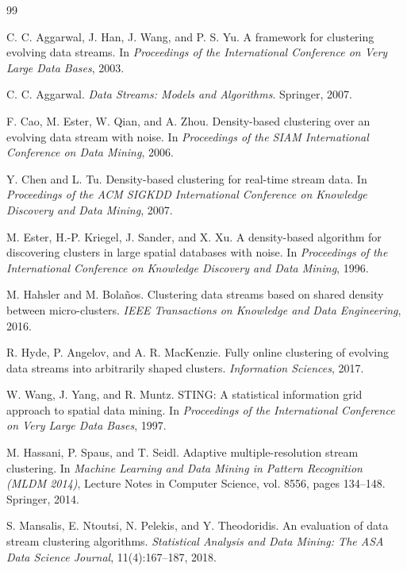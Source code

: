 \documentclass[11pt]{article}
\begin{document}

\begin{thebibliography}{99}

C. C. Aggarwal, J. Han, J. Wang, and P. S. Yu.
A framework for clustering evolving data streams.
In \textit{Proceedings of the International Conference on Very Large Data Bases}, 2003.

C. C. Aggarwal.
\textit{Data Streams: Models and Algorithms}.
Springer, 2007.

F. Cao, M. Ester, W. Qian, and A. Zhou.
Density-based clustering over an evolving data stream with noise.
In \textit{Proceedings of the SIAM International Conference on Data Mining}, 2006.

Y. Chen and L. Tu.
Density-based clustering for real-time stream data.
In \textit{Proceedings of the ACM SIGKDD International Conference on Knowledge Discovery and Data Mining}, 2007.

M. Ester, H.-P. Kriegel, J. Sander, and X. Xu.
A density-based algorithm for discovering clusters in large spatial databases with noise.
In \textit{Proceedings of the International Conference on Knowledge Discovery and Data Mining}, 1996.

M. Hahsler and M. Bola{\~n}os.
Clustering data streams based on shared density between micro-clusters.
\textit{IEEE Transactions on Knowledge and Data Engineering}, 2016.

R. Hyde, P. Angelov, and A. R. MacKenzie.
Fully online clustering of evolving data streams into arbitrarily shaped clusters.
\textit{Information Sciences}, 2017.

W. Wang, J. Yang, and R. Muntz.
STING: A statistical information grid approach to spatial data mining.
In \textit{Proceedings of the International Conference on Very Large Data Bases}, 1997.

M. Hassani, P. Spaus, and T. Seidl.
Adaptive multiple-resolution stream clustering.
In \textit{Machine Learning and Data Mining in Pattern Recognition (MLDM 2014)}, Lecture Notes in Computer Science, vol. 8556, pages 134--148. Springer, 2014.

S. Mansalis, E. Ntoutsi, N. Pelekis, and Y. Theodoridis.
An evaluation of data stream clustering algorithms.
\textit{Statistical Analysis and Data Mining: The ASA Data Science Journal}, 11(4):167--187, 2018.


\end{thebibliography}
\end{document}
